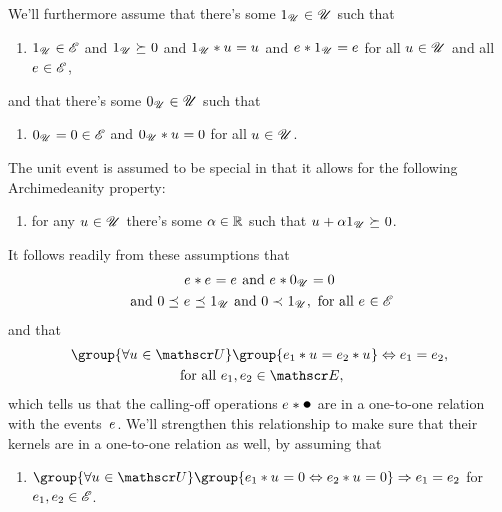 \documentclass[preprint]{isipta2025}
\begin{document}
We'll furthermore assume that there's some  \(\uniteventopt\in\opts\) such that
\begin{enumerate}[resume*=events,widest=4]
\item\label{axiom:event:unit:event}  \(\uniteventopt\in\eventopts\) and \(\uniteventopt\optgeq0\) and \(\uniteventopt\ast\opt=\opt\) and \(\eventopt\ast\uniteventopt=\eventopt\) for all \(\opt\in\opts\) and all \(\eventopt\in\eventopts\),
\end{enumerate}
and that there's some  \(\nulleventopt\in\opts\) such that
\begin{enumerate}[resume*=events,widest=5]
\item\label{axiom:event:null:event}  \(\nulleventopt=0\in\eventopts\) and \(\nulleventopt\ast\opt=0\) for all \(\opt\in\opts\).
\end{enumerate}
The unit event is assumed to be special in that it allows for the following Archimedeanity property:
\begin{enumerate}[resume*=events,widest=6]
\item\label{axiom:event:archimedianity} for any \(\opt\in\opts\) there's some \(\alpha\in\reals\) such that \(\opt+\alpha\uniteventopt\optgeq0\).
\end{enumerate}
It follows readily from these assumptions that
\begin{multline}\label{eq:event:extra:properties}
\eventopt\ast\eventopt=\eventopt
\text{ and }
\eventopt\ast\nulleventopt=0\\
\text{ and }
0\optleq\eventopt\optleq\uniteventopt
\text{ and }
0\optlt\uniteventopt,
\text{ for all \(\eventopt\in\eventopts\)}
\end{multline}
and that
\begin{multline}\label{eq:event:bijection}
\group{\forall\opt\in\opts}
\group{\eventopt[1]\ast\opt=\eventopt[2]\ast\opt}
\ifandonlyif\eventopt[1]=\eventopt[2],\\
\text{ for all \(\eventopt[1],\eventopt[2]\in\eventopts\)},
\end{multline}
which tells us that the calling-off operations \(\calledoff{\bolleke}\) are in a one-to-one relation with the events~\(\eventopt\).
We'll strengthen this relationship to make sure that their kernels are in a one-to-one relation as well, by assuming that
\begin{enumerate}[resume*=events,widest=7]
\item\label{axiom:event:kernels} \(\group{\forall\opt\in\opts}\group{\eventopt[1]\ast\opt=0\ifandonlyif\eventopt[2]\ast\opt=0}\then\eventopt[1]=\eventopt[2]\) for  \(\eventopt[1],\eventopt[2]\in\eventopts\).
\end{enumerate}
\end{document}
